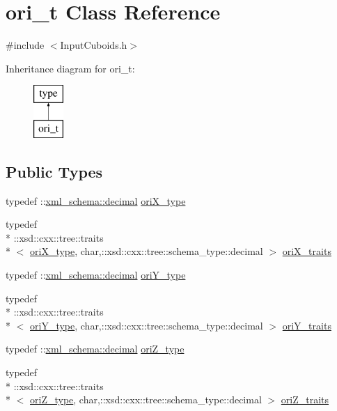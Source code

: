 \hypertarget{classori__t}{\section{ori\-\_\-t Class Reference}
\label{classori__t}
}


{\ttfamily \#include $<$Input\-Cuboids.\-h$>$}

Inheritance diagram for ori\-\_\-t\-:\begin{figure}[H]
\begin{center}
\leavevmode
\includegraphics[height=2.000000cm]{classori__t}
\end{center}
\end{figure}
\subsection*{Public Types}
\begin{DoxyCompactItemize}
\item 
typedef \-::\hyperlink{namespacexml__schema_a69bfaf24f63a8c18ebd8e21db6b343df}{xml\-\_\-schema\-::decimal} \hyperlink{classori__t_a0d346be84e44760fbb97262b96c52110}{ori\-X\-\_\-type}
\item 
typedef \\*
\-::xsd\-::cxx\-::tree\-::traits\\*
$<$ \hyperlink{classori__t_a0d346be84e44760fbb97262b96c52110}{ori\-X\-\_\-type}, char,\-::xsd\-::cxx\-::tree\-::schema\-\_\-type\-::decimal $>$ \hyperlink{classori__t_a41d83d718921a993be9cef2cbc9b4df2}{ori\-X\-\_\-traits}
\item 
typedef \-::\hyperlink{namespacexml__schema_a69bfaf24f63a8c18ebd8e21db6b343df}{xml\-\_\-schema\-::decimal} \hyperlink{classori__t_ad04f9558bf4506128686a25e23817966}{ori\-Y\-\_\-type}
\item 
typedef \\*
\-::xsd\-::cxx\-::tree\-::traits\\*
$<$ \hyperlink{classori__t_ad04f9558bf4506128686a25e23817966}{ori\-Y\-\_\-type}, char,\-::xsd\-::cxx\-::tree\-::schema\-\_\-type\-::decimal $>$ \hyperlink{classori__t_a48bd94e6aadcf83768ddc7cf92ce5ce2}{ori\-Y\-\_\-traits}
\item 
typedef \-::\hyperlink{namespacexml__schema_a69bfaf24f63a8c18ebd8e21db6b343df}{xml\-\_\-schema\-::decimal} \hyperlink{classori__t_ade8315fb919208a45ec58303232b842b}{ori\-Z\-\_\-type}
\item 
typedef \\*
\-::xsd\-::cxx\-::tree\-::traits\\*
$<$ \hyperlink{classori__t_ade8315fb919208a45ec58303232b842b}{ori\-Z\-\_\-type}, char,\-::xsd\-::cxx\-::tree\-::schema\-\_\-type\-::decimal $>$ \hyperlink{classori__t_ad45b223f4cb199de8834bb2fcbbcbe77}{ori\-Z\-\_\-traits}
\end{DoxyCompactItemize}
